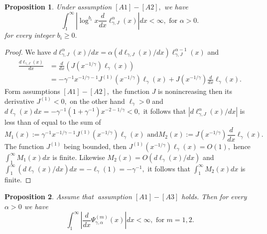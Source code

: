 \documentclass[12pt,reqno,openbib,runningheads,a4paper,portrait]{amsart}%
\newtheorem{proposition}{Proposition}[section]
\begin{document}
\begin{proposition}
\textbf{\label{prop3bis}}Under assumption $\left[  A1\right]  -\left[
A2\right]  ,$ we have
\[
\int_{1}^{\infty}\left\vert \log^{b_{i}}x\frac{d}{dx}\ell_{\gamma,J}^{\alpha
}\left(  x\right)  \right\vert dx<\infty,\text{ for }\alpha>0.
\]
for every integer $b_{i}\geq0.$
\end{proposition}

\begin{proof}
We have $d\ell_{\gamma,J}^{\alpha}\left(  x\right)  /dx=\alpha\left(
d\ell_{\gamma,J}\left(  x\right)  /dx\right)  \ell_{\gamma,J}^{\alpha
-1}\left(  x\right)  $ and
\begin{align*}
\frac{d\ell_{\gamma,J}\left(  x\right)  }{dx}  &  =\frac{d}{dx}\left(
J\left(  x^{-1/\gamma}\right)  \ell_{\gamma}\left(  x\right)  \right) \\
&  =-\gamma^{-1}x^{-1/\gamma-1}J^{\left(  1\right)  }\left(  x^{-1/\gamma
}\right)  \ell_{\gamma}\left(  x\right)  +J\left(  x^{-1/\gamma}\right)
\frac{d}{dx}\ell_{\gamma}\left(  x\right)  .
\end{align*}
Form assumptions $\left[  A1\right]  -\left[  A2\right]  ,$ the function $J$
is nonincreasing then its derivative $J^{\left(  1\right)  }<0,$ on the other
hand $\ell_{\gamma}>0$ and $d\ell_{\gamma}\left(  x\right)  dx=-\gamma
^{-1}\left(  1+\gamma^{-1}\right)  x^{-2-1/\gamma}<0,$ it follows that
$\left\vert d\ell_{\gamma,J}^{\alpha}\left(  x\right)  /dx\right\vert $ is
less than of equal to the sum of
\[
M_{1}\left(  x\right)  :=\gamma^{-1}x^{-1/\gamma-1}J^{\left(  1\right)
}\left(  x^{-1/\gamma}\right)  \ell_{\gamma}\left(  x\right)  \text{ and
}M_{2}\left(  x\right)  :=J\left(  x^{-1/\gamma}\right)  \frac{d}{dx}%
\ell_{\gamma}\left(  x\right)  .\text{ }%
\]
The function $J^{\left(  1\right)  }$ being bounded, then $J^{\left(
1\right)  }\left(  x^{-1/\gamma}\right)  \ell_{\gamma}\left(  x\right)
=O\left(  1\right)  ,$ hence $\int_{1}^{\infty}M_{1}\left(  x\right)  dx$ is
finite. Likewise $M_{2}\left(  x\right)  =O\left(  d\ell_{\gamma}\left(
x\right)  /dx\right)  $ and $\int_{1}^{\infty}\left(  d\ell_{\gamma}\left(
x\right)  /dx\right)  dx=-\ell_{\gamma}\left(  1\right)  =-\gamma^{-1},$ it
follows that $\int_{1}^{\infty}M_{2}\left(  x\right)  dx$ is finite.
\end{proof}

\begin{proposition}
\textbf{\label{prop3}}Assume that\textbf{\ }assumption $\left[  A1\right]
-\left[  A3\right]  $ holds. Then for every $\alpha>0$ we have
\[
\int_{1}^{\infty}\left\vert \frac{d}{dx}\Psi_{\gamma,\alpha}^{\left(
m\right)  }\left(  x\right)  \right\vert dx<\infty,\text{ for }m=1,2.
\]

\end{proposition}
\end{document}
